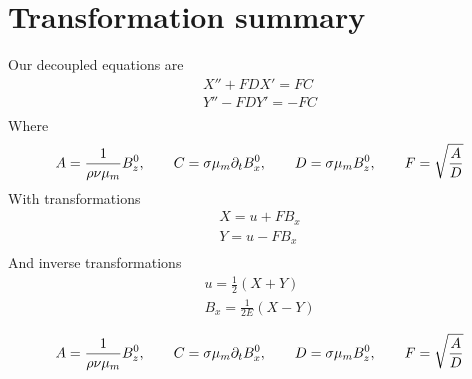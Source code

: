 \documentclass[11pt]{article}
\begin{document}
\section{Transformation summary}
Our decoupled equations are
\begin{equation}\begin{aligned}
X'' + F D X' =   FC \\
Y'' - F D Y' = - FC \\
\end{aligned} \end{equation}
Where
\begin{equation}\begin{aligned}
A = \frac{1}{\rho \nu {\mu_m}} B_z^0, \qquad
C = \sigma {\mu_m} \partial_t B_x^0, \qquad
D = \sigma {\mu_m} B_z^0, \qquad
F = \sqrt{\frac{A}{D}} \\
\end{aligned} \end{equation}
With transformations
\begin{equation}\begin{aligned}
X = u + F B_x \\
Y = u - F B_x \\
\end{aligned} \end{equation}
And inverse transformations
\begin{equation}\begin{aligned}
u   = \frac{1}{2} \left( X + Y \right) \\
B_x = \frac{1}{2E} \left( X - Y \right) \\
\end{aligned} \end{equation}
\begin{equation}\begin{aligned}
A = \frac{1}{\rho \nu {\mu_m}} B_z^0, \qquad
C = \sigma {\mu_m} \partial_t B_x^0, \qquad
D = \sigma {\mu_m} B_z^0, \qquad
F = \sqrt{\frac{A}{D}} \\
\end{aligned} \end{equation}
\end{document}
